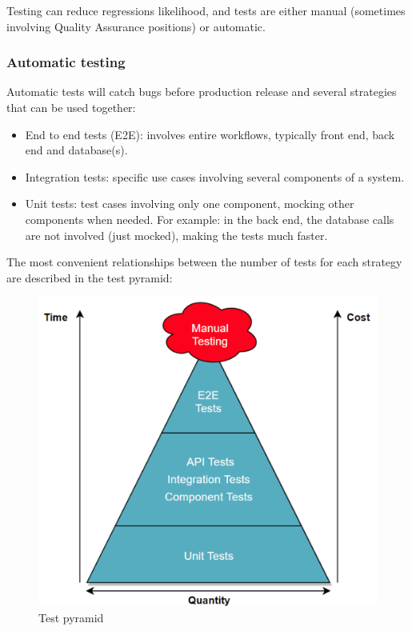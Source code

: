 \documentclass[11pt,english]{article} %
\begin{document}
Testing can reduce regressions likelihood, and tests are either manual (sometimes involving Quality Assurance positions) or automatic.

\subsubsection{Automatic testing}
Automatic tests will catch bugs before production release and several strategies that can be used together:
\begin{itemize}
	\item End to end tests (E2E): involves entire workflows, typically front end, back end and database(s).
	\item Integration tests: specific use cases involving several components of a system.
	\item Unit tests: test cases involving only one component, mocking other components when needed. For example: in the back end, the database calls are not involved (just mocked), making the tests much faster.
\end{itemize}

The most convenient relationships between the number of tests for each strategy are described in the test pyramid:
\begin{figure}[H]
  \centering
  \includegraphics[scale=0.2]{img/test-pyramid.png}
  \caption{Test pyramid \cite{test-pyramid}}
\end{figure}
\end{document}
